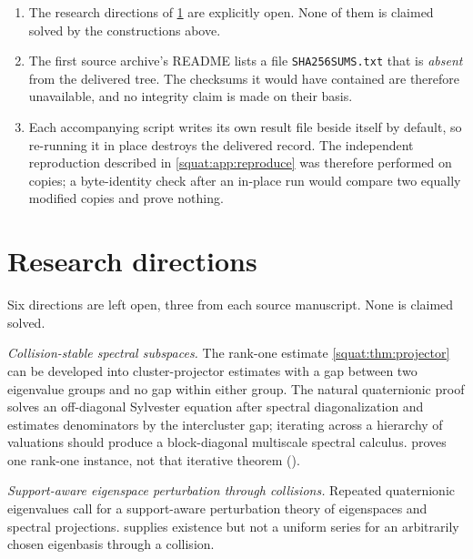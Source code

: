 \documentclass[11pt,letterpaper]{article}
\numberwithin{equation}{section}
\theoremstyle{definition}
\theoremstyle{remark}
\newcommand{\No}{\mathbf{No}}
\newcommand{\R}{\mathbb R}
\begin{document}
\begin{enumerate}[label=\textup{(N\arabic*)},leftmargin=3.2em]
it is \emph{alternative} rather than associative, and the centralizer, linear-factor and
matrix proofs in this article cannot be copied without revisiting their uses of
associativity. Later Cayley--Dickson algebras already have zero divisors over $\R$
\cite{Baez}, and those examples persist under scalar extension to $\No$; infinite
coefficients do not repair an algebraic zero-divisor identity. This is an observation,
not an octonionic theory.
\item\label{squat:nc:directionsopen} The research directions of
\cref{squat:sub:directions} are explicitly open. None of them is claimed solved by the
constructions above.
\item\label{squat:nc:sha} The first source archive's README lists a file
\texttt{SHA256SUMS.txt} that is \emph{absent} from the delivered tree. The checksums it
would have contained are therefore unavailable, and no integrity claim is made on their
basis.
\item\label{squat:nc:selfwriting} Each accompanying script writes its own result file
beside itself by default, so re-running it in place destroys the delivered record. The
independent reproduction described in \cref{squat:app:reproduce} was therefore performed on
copies; a byte-identity check after an in-place run would compare two equally modified
copies and prove nothing.
\end{enumerate}

\section{Research directions}\label{squat:sub:directions}

Six directions are left open, three from each source manuscript. None is claimed solved.

\emph{Collision-stable spectral subspaces.} The rank-one estimate
\cref{squat:thm:projector} can be developed into cluster-projector estimates with a gap
between two eigenvalue groups and no gap within either group. The natural quaternionic
proof solves an off-diagonal Sylvester equation after spectral diagonalization and
estimates denominators by the intercluster gap; iterating across a hierarchy of valuations
should produce a block-diagonal multiscale spectral calculus. 
proves one rank-one instance, not that iterative theorem
().

\emph{Support-aware eigenspace perturbation through collisions.} Repeated quaternionic
eigenvalues call for a support-aware perturbation theory of eigenspaces and spectral
projections.  supplies existence but not a uniform series for an
arbitrarily chosen eigenbasis through a collision.
\end{document}
